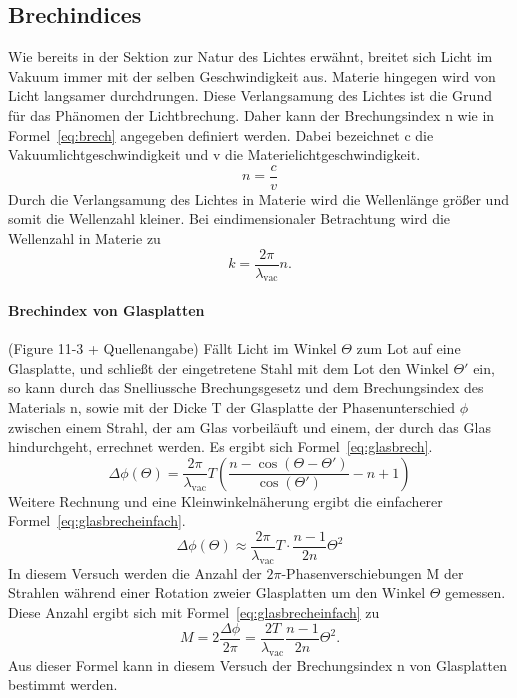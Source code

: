 \subsection{Brechindices}
Wie bereits in der Sektion zur Natur des Lichtes erwähnt, 
breitet sich Licht im Vakuum immer mit der selben Geschwindigkeit 
aus. Materie hingegen wird von Licht langsamer durchdrungen. 
Diese Verlangsamung des Lichtes ist die Grund für das Phänomen der 
Lichtbrechung. Daher kann der Brechungsindex n wie in 
Formel~\eqref{eq:brech} 
angegeben definiert werden. Dabei bezeichnet c die 
Vakuumlichtgeschwindigkeit und v die Materielichtgeschwindigkeit.
\begin{equation}
n = \frac{c}{v}
\label{eq:brech}
\end{equation}
Durch die Verlangsamung des Lichtes in Materie wird die Wellenlänge 
größer und somit die Wellenzahl kleiner. Bei eindimensionaler 
Betrachtung wird die Wellenzahl in Materie zu
\begin{equation*}
k = \frac{2\pi}{\lambda_\text{vac}}n.
\end{equation*}
\paragraph{Brechindex von Glasplatten}
(Figure 11-3 + Quellenangabe)
Fällt Licht im Winkel $\Theta$ zum Lot auf eine Glasplatte, 
und schließt der eingetretene Stahl mit dem Lot den Winkel $\Theta'$ ein, 
so kann durch das 
Snelliussche Brechungsgesetz und dem Brechungsindex des Materials n, 
sowie mit der Dicke T der Glasplatte der Phasenunterschied $\phi$ zwischen 
einem Strahl, der am Glas vorbeiläuft und einem, der durch das Glas 
hindurchgeht, errechnet werden. Es ergibt sich 
Formel~\eqref{eq:glasbrech}.
\begin{equation}
\Delta\phi(\Theta) = \frac{2\pi}{\lambda_\text{vac}}T\left(
\frac{n-\cos(\Theta - \Theta')}{\cos(\Theta')} - n+1\right)
\label{eq:glasbrech}
\end{equation}
Weitere Rechnung und eine Kleinwinkelnäherung ergibt die einfacherer 
Formel~\eqref{eq:glasbrecheinfach}.
\begin{equation}
\Delta\phi(\Theta) \approx \frac{2\pi}{\lambda_\text{vac}}T\cdot
\frac{n-1}{2n}\Theta^2
\label{eq:glasbrecheinfach}
\end{equation}
In diesem Versuch werden die Anzahl der $2\pi$-Phasenverschiebungen M
der Strahlen während einer Rotation zweier Glasplatten um den Winkel 
$\Theta$ gemessen. Diese Anzahl ergibt sich mit 
Formel~\eqref{eq:glasbrecheinfach} zu
\begin{equation}
M = 2\frac{\Delta\phi}{2\pi} = \frac{2T}{\lambda_\text{vac}}
\frac{n-1}{2n}\Theta^2.
\label{eq:glasfringes}
\end{equation}
Aus dieser Formel kann in diesem Versuch der Brechungsindex n von 
Glasplatten bestimmt werden.\\
